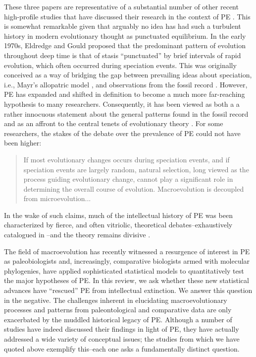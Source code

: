 These three papers are representative of a substantial number of other recent high-profile studies that have discussed their research in the context of PE \citep[e.g.,][]{Hunt2007, Hunt2008, Huntetal2008, Webster2003, Bokma2002, Bokma2008, Ingram2011, Uyeda2011, Rabosky2012, Hunt2012, Bartoszek2013, Rabosky2013, Simpson2013, Atkinson2008, Baca2013}. This is somewhat remarkable given that arguably no idea has had such a turbulent history in modern evolutionary thought as punctuated equilibrium. In the early 1970s, Eldredge and Gould \citep{Eldredge1971, EldredgeGould1972, GouldEldredge1977} proposed that the predominant pattern of evolution throughout deep time is that of stasis ``punctuated'' by brief intervals of rapid evolution, which often occurred during speciation events. This was originally conceived as a way of bridging the gap between prevailing ideas about speciation, i.e., Mayr's allopatric model \citeyearpar{Mayr}, and observations from the fossil record \citep{Sepkoskibook}. However, PE has expanded and shifted in definition to become a much more far-reaching hypothesis to many researchers. Consequently, it has been viewed as both a a rather innocuous statement about the general patterns found in the fossil record and as an affront to the central tenets of evolutionary theory \citep{Stanley1975, Stanley1979, Gould1980, Charlesworth1982, Levinton2001}. For some researchers, the stakes of the debate over the prevalence of PE could not have been higher:

\begin{quote}
If most evolutionary changes occurs during speciation events, and if speciation events are largely random, natural selection, long viewed as the process guiding evolutionary change, cannot play a significant role in determining the overall course of evolution. Macroevolution is decoupled from microevolution... \citep[][p. 648]{Stanley1975}
\end{quote}

In the wake of such claims, much of the intellectual history of PE was been characterized by fierce, and often vitriolic, theoretical debates--exhaustively catalogued in \citep{Levinton2001, Gould2002}--and the theory remains divisive \citep[for more details on the history of the idea, see][]{Sepkoskibook}.

The field of macroevolution has recently witnessed a resurgence of interest in PE as paleobiologists and, increasingly, comparative biologists armed with molecular phylogenies, have applied sophisticated statistical models to quantitatively test the major hypotheses of PE. In this review, we ask whether these new statistical advances have ``rescued'' PE from intellectual extinction. We answer this question in the negative. The challenges inherent in elucidating macroevolutionary processes and patterns from paleontological and comparative data are only exacerbated by the muddled historical legacy of PE. Although a number of studies have indeed discussed their findings in light of PE, they have actually addressed a wide variety of conceptual issues; the studies from which we have quoted above exemplify this--each one asks a fundamentally distinct question.

